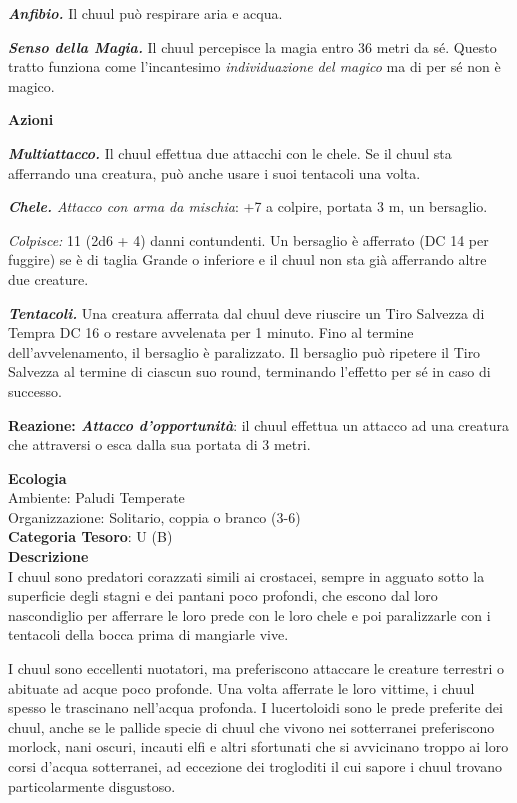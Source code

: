 \begin{multicols}{2}
{\emph{\textbf{Anfibio.}} Il chuul può respirare aria e acqua.

\emph{\textbf{Senso della Magia.}} Il chuul percepisce la magia entro 36 metri da sé. Questo tratto funziona come l'incantesimo \emph{individuazione} \emph{del magico} ma di per sé non è magico.

\textbf{Azioni}

\emph{\textbf{Multiattacco.}} Il chuul effettua due attacchi con le chele. Se il chuul sta afferrando una creatura, può anche usare i suoi tentacoli una volta.

\emph{\textbf{Chele.} Attacco con arma da mischia}: +7 a colpire, portata 3 m, un bersaglio.

\emph{Colpisce:} 11 (2d6 + 4) danni contundenti. Un bersaglio è afferrato (DC 14 per fuggire) se è di taglia Grande o inferiore e il chuul non sta già afferrando altre due creature.

\emph{\textbf{Tentacoli.}} Una creatura afferrata dal chuul deve riuscire un Tiro Salvezza di Tempra DC 16 o restare avvelenata per 1 minuto. Fino al termine dell'avvelenamento, il bersaglio è paralizzato. Il bersaglio può ripetere il Tiro Salvezza al termine di ciascun suo round, terminando l'effetto per sé in caso di successo.

\textbf{Reazione: \emph{Attacco d'opportunità}}: il chuul effettua un attacco ad una creatura che attraversi o esca dalla sua portata di 3 metri.

\textbf{Ecologia}\\
Ambiente: Paludi Temperate\\
Organizzazione: Solitario, coppia o branco (3-6)\\
\textbf{Categoria Tesoro}: U (B)\\
\textbf{Descrizione}\\
I chuul sono predatori corazzati simili ai crostacei, sempre in agguato sotto la superficie degli stagni e dei pantani poco profondi, che escono dal loro nascondiglio per afferrare le loro prede con le loro chele e poi paralizzarle con i tentacoli della bocca prima di mangiarle vive.

I chuul sono eccellenti nuotatori, ma preferiscono attaccare le creature terrestri o abituate ad acque poco profonde. Una volta afferrate le loro vittime, i chuul spesso le trascinano nell'acqua profonda. I lucertoloidi sono le prede preferite dei chuul, anche se le pallide specie di chuul che vivono nei sotterranei preferiscono morlock, nani oscuri, incauti elfi e altri sfortunati che si avvicinano troppo ai loro corsi d'acqua sotterranei, ad eccezione dei trogloditi il cui sapore i chuul trovano particolarmente disgustoso.

}
\end{multicols}

